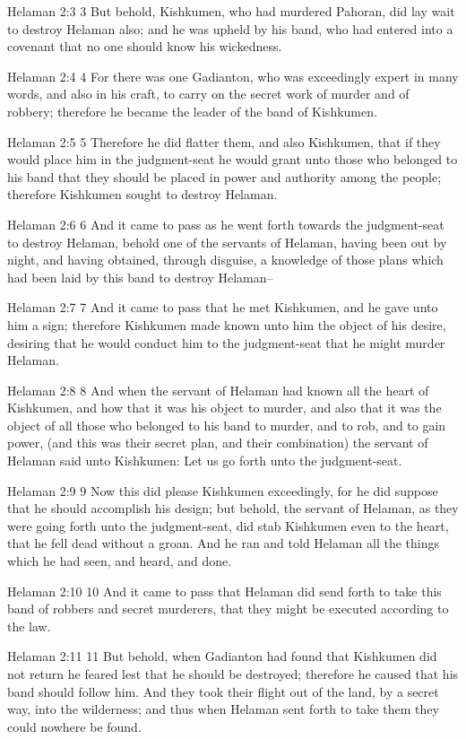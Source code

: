 Helaman 2:3
 3 But behold, Kishkumen, who had murdered Pahoran, did lay wait
to destroy Helaman also; and he was upheld by his band, who had
entered into a covenant that no one should know his wickedness.

Helaman 2:4
 4 For there was one Gadianton, who was exceedingly expert in
many words, and also in his craft, to carry on the secret work of
murder and of robbery; therefore he became the leader of the band
of Kishkumen.

Helaman 2:5
 5 Therefore he did flatter them, and also Kishkumen, that if
they would place him in the judgment-seat he would grant unto
those who belonged to his band that they should be placed in
power and authority among the people; therefore Kishkumen sought
to destroy Helaman.

Helaman 2:6
 6 And it came to pass as he went forth towards the judgment-seat
to destroy Helaman, behold one of the servants of Helaman, having
been out by night, and having obtained, through disguise, a
knowledge of those plans which had been laid by this band to
destroy Helaman--

Helaman 2:7
 7 And it came to pass that he met Kishkumen, and he gave unto
him a sign; therefore Kishkumen made known unto him the object of
his desire, desiring that he would conduct him to the
judgment-seat that he might murder Helaman.

Helaman 2:8
 8 And when the servant of Helaman had known all the heart of
Kishkumen, and how that it was his object to murder, and also
that it was the object of all those who belonged to his band to
murder, and to rob, and to gain power, (and this was their secret
plan, and their combination) the servant of Helaman said unto
Kishkumen: Let us go forth unto the judgment-seat.

Helaman 2:9
 9 Now this did please Kishkumen exceedingly, for he did suppose
that he should accomplish his design; but behold, the servant of
Helaman, as they were going forth unto the judgment-seat, did
stab Kishkumen even to the heart, that he fell dead without a
groan. And he ran and told Helaman all the things which he had
seen, and heard, and done.

Helaman 2:10
 10 And it came to pass that Helaman did send forth to take this
band of robbers and secret murderers, that they might be executed
according to the law.

Helaman 2:11
 11 But behold, when Gadianton had found that Kishkumen did not
return he feared lest that he should be destroyed; therefore he
caused that his band should follow him. And they took their
flight out of the land, by a secret way, into the wilderness; and
thus when Helaman sent forth to take them they could nowhere be
found.

